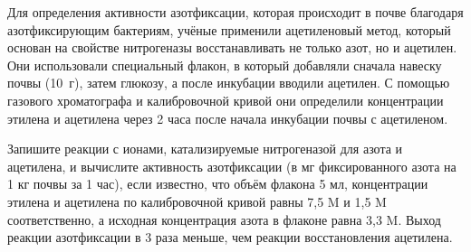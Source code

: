 
Для определения активности азотфиксации, которая происходит в почве благодаря азотфиксирующим бактериям, 
учёные применили ацетиленовый метод, который основан на свойстве нитрогеназы восстанавливать не только азот, 
но и ацетилен. Они использовали специальный флакон, в который добавляли сначала навеску почвы (10~г), затем глюкозу, 
а после инкубации вводили ацетилен. С помощью газового хроматографа и калибровочной кривой они определили концентрации 
этилена и ацетилена через 2 часа после начала инкубации почвы с ацетиленом.

Запишите реакции с ионами, катализируемые нитрогеназой для азота и ацетилена, и вычислите активность азотфиксации 
(в мг фиксированного азота на 1 кг почвы за 1 час), если известно, что объём флакона 5 мл, концентрации этилена 
и ацетилена по калибровочной кривой равны 7,5 M и 1,5 M соответственно, а исходная концентрация азота в флаконе 
равна 3,3 M. Выход реакции азотфиксации в 3 раза меньше, чем реакции восстановления ацетилена.
